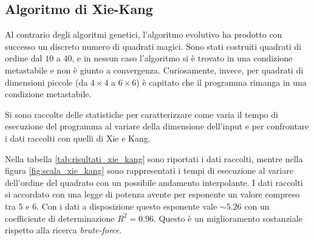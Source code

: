 \documentclass[italian,twoside,twocolumn]{article}
\begin{document}
\subsection{Algoritmo di Xie-Kang}
Al contrario degli algoritmi genetici, l'algoritmo evolutivo ha prodotto con successo un discreto numero di quadrati magici. Sono stati costruiti quadrati di ordine dal $ 10 $ a $ 40 $, e in nessun caso l'algoritmo si è trovato in una condizione metastabile e non è giunto a convergenza. Curiosamente, invece, per quadrati di dimensioni piccole (da $ 4\times 4 $ a $ 6\times6 $) è capitato che il programma rimanga in una condizione metastabile. 

Si sono raccolte delle statistiche per caratterizzare come varia il tempo di esecuzione del programma al variare della dimensione dell'input e per confrontare i dati raccolti con quelli di Xie e Kang. 

Nella tabella \ref{tab:risultati_xie_kang} sono riportati i dati raccolti, mentre nella figura \ref{fig:scala_xie_kang} sono rappresentati i tempi di esecuzione al variare dell'ordine del quadrato con un possibile andamento interpolante. I dati raccolti si accordato con una legge di potenza avente per esponente un valore compreso tra $ 5 $ e $ 6 $. Con i dati a disposizione questo esponente vale $ \sim \num{5.26} $ con un coefficiente di determinazione $ R^2 = \num{0.96} $. Questo è un miglioramento sostanziale rispetto alla ricerca \emph{brute-force}.
\end{document}
